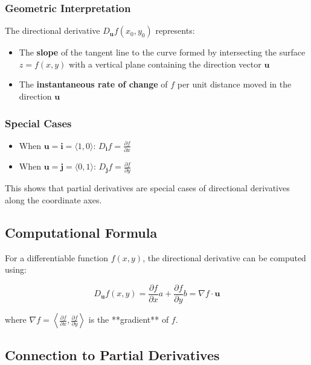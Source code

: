 \subsubsection{Geometric Interpretation}

The directional derivative \(D_{\mathbf{u}}f(x_0, y_0)\) represents:
\begin{itemize}
  \item The \textbf{slope} of the tangent line to the curve formed by intersecting the surface \(z = f(x, y)\) with a vertical plane containing the direction vector \(\mathbf{u}\)
  \item The \textbf{instantaneous rate of change} of \(f\) per unit distance moved in the direction \(\mathbf{u}\)
\end{itemize}

\subsubsection{Special Cases}

\begin{itemize}
  \item When \(\mathbf{u} = \mathbf{i} = \langle 1, 0 \rangle\): \(D_{\mathbf{i}}f = \frac{\partial f}{\partial x}\)
  \item When \(\mathbf{u} = \mathbf{j} = \langle 0, 1 \rangle\): \(D_{\mathbf{j}}f = \frac{\partial f}{\partial y}\)
\end{itemize}

This shows that partial derivatives are special cases of directional derivatives along the coordinate axes.

\subsection{Computational Formula}

For a differentiable function \(f(x, y)\), the directional derivative can be computed using:

\[
  D_{\mathbf{u}}f(x, y) = \frac{\partial f}{\partial x} a + \frac{\partial f}{\partial y} b = \nabla f \cdot \mathbf{u}
\]

where \(\nabla f = \left\langle \frac{\partial f}{\partial x}, \frac{\partial f}{\partial y} \right\rangle\) is the **gradient** of \(f\).

\subsection{Connection to Partial Derivatives}

